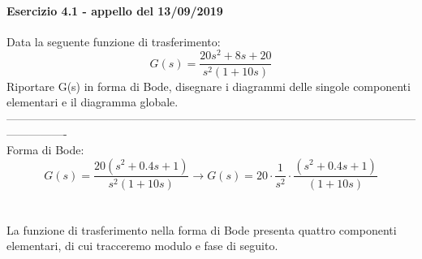 \documentclass[12pt,a4paper]{article}
\begin{document}
	\paragraph*{Esercizio 4.1 - appello del 13/09/2019} Data la seguente funzione di trasferimento:
	\[
		G(s) = \frac{20s^2 + 8s + 20}{s^2(1+10s)}
	\]
	Riportare G(s) in forma di Bode, disegnare i diagrammi delle singole componenti elementari e il diagramma globale.\\
	----------------------------------------------------------------------------------------------------------------------------\\Forma di Bode: 
	\[
		G(s) = \frac{20(s^2 + 0.4s + 1)}{s^2(1+10s)} \rightarrow G(s) = 20 \cdot \frac{1}{s^2} \cdot \frac{(s^2 + 0.4s + 1)}{(1+10s)}
	\]
	\\ \\
	La funzione di trasferimento nella forma di Bode presenta quattro componenti elementari, di cui tracceremo modulo e fase di seguito.\\
\end{document}
